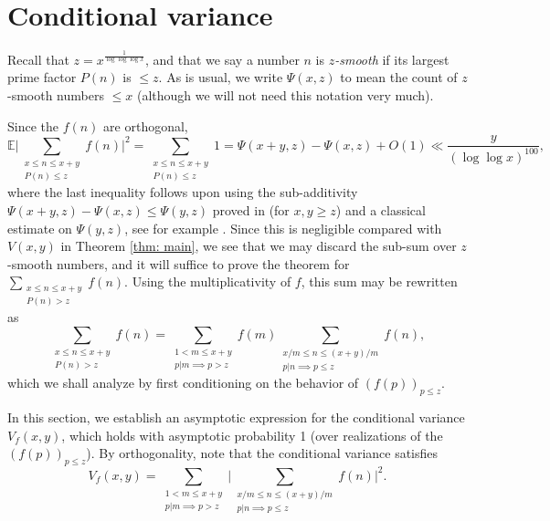 \documentclass[12pt, notitlepage]{amsart}
\numberwithin{equation}{section}
\def\E{\mathbb E}
\theoremstyle{remark}
\theoremstyle{definition}
\theoremstyle{remark}
\numberwithin{equation}{section}
\begin{document}
\section{Conditional variance}\label{SEC: CONDVAR}
Recall that $z = x^{\frac{1}{\log \log \log x}}$, and that we say a number $n$ is {\em $z$-smooth} if its largest prime factor $P(n)$ is $\leq z$. As is usual, we write $\Psi(x,z)$ to mean the count of $z$-smooth numbers $\leq x$ (although we will not need this notation very much).

Since the $f(n)$ are orthogonal, 
$$ 
\E \Big| \sum_{\substack{x \le n \le x+y \\ P(n)\le z   }  } f(n) \Big|^{2} = \sum_{\substack{x \le n \le x+y \\ P(n)\le z  }  } 1 = \Psi(x+y, z) - \Psi(x, z) + O(1) \ll \frac{y}{(\log\log x)^{100}} ,  
$$
where the last inequality follows upon using the sub-additivity $\Psi(x+y, z) - \Psi(x, z) \le \Psi(y, z)$ proved in \cite{Hildebrand85} (for $x,y \geq z$) and a classical estimate on $\Psi(y, z)$, see for example \cite[(1.12)]{Gran08}.   Since this is negligible compared with $V(x,y)$ in Theorem \ref{thm: main}, we see that we may discard the sub-sum over $z$-smooth numbers, and it will suffice to prove the theorem for $\sum_{\substack{x \le n \le x+y \\ P(n) > z  }  } f(n)$. Using the multiplicativity of $f$, this sum may be rewritten as
$$ 
\sum_{\substack{x \le n \le x+y \\ P(n) > z  }  } f(n) = \sum_{ \substack{ 1<m\le x+y \\ p|m \implies p>z}} f(m) \sum_{\substack{x/m\le n \le (x+y)/m \\ p|n \implies p\le z  }  } f(n) , 
$$
which we shall analyze by first conditioning on the behavior of $(f(p))_{p \leq z}$.

In this section, we establish an asymptotic expression for the conditional variance $V_f(x, y)$, which holds with asymptotic probability 1 (over realizations of the $(f(p))_{p \leq z}$). By orthogonality, note that the conditional variance satisfies 
\begin{equation}\label{eqn: Vf}
 V_f(x, y) =  \sum_{ \substack{ 1<m\le x+y \\ p|m \implies p>z}} \Big| \sum_{\substack{x/m\le n \le (x+y)/m \\ p|n \implies p\le z  }  } f(n) \Big|^{2}.    
\end{equation}
\end{document}
